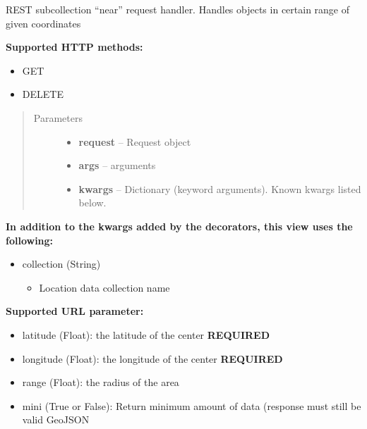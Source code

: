 \documentclass[letterpaper,10pt,english]{sphinxmanual}
\begin{document}
\begin{fulllineitems}
\label{codedoc/locdoc:lbd_backend.LBD_REST_locationdata.views.collection_near}
REST subcollection ``near'' request handler. Handles objects in certain range of given coordinates

\textbf{Supported HTTP methods:}
\begin{itemize}
\item {} 
GET

\item {} 
DELETE

\end{itemize}
\begin{quote}\begin{description}
\item[{Parameters}] \leavevmode\begin{itemize}
\item {} 
\textbf{request} -- Request object

\item {} 
\textbf{args} -- arguments

\item {} 
\textbf{kwargs} -- Dictionary (keyword arguments). Known kwargs listed below.

\end{itemize}

\end{description}\end{quote}

\textbf{In addition to the kwargs added by the decorators, this view uses the following:}
\begin{itemize}
\item {} 
collection (String)
\begin{itemize}
\item {} 
Location data collection name

\end{itemize}

\end{itemize}

\textbf{Supported URL parameter:}
\begin{itemize}
\item {} 
latitude (Float): the latitude of the center \textbf{REQUIRED}

\item {} 
longitude (Float): the longitude of the center \textbf{REQUIRED}

\item {} 
range (Float): the radius of the area

\item {} 
mini (True or False): Return minimum amount of data (response must still be valid GeoJSON

\end{itemize}

\end{fulllineitems}
\end{document}
